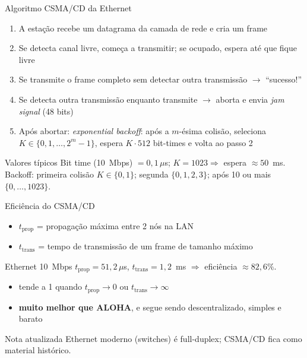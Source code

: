 \documentclass[aspectratio=169,11pt]{beamer}
\begin{document}
\begin{frame}{Algoritmo CSMA/CD da Ethernet}
  \begin{enumerate}
    \item A estação recebe um datagrama da camada de rede e cria um frame
    \item Se detecta canal livre, começa a transmitir; se ocupado, espera até que fique livre
    \item Se transmite o frame completo sem detectar outra transmissão $\rightarrow$ ``sucesso!''
    \item Se detecta outra transmissão enquanto transmite $\rightarrow$ aborta e envia \emph{jam signal} (48 bits)
    \item Após abortar: \emph{exponential backoff}: após a $m$-ésima colisão, seleciona $K\in\{0,1,\ldots,2^m-1\}$, espera $K\cdot 512$ bit-times e volta ao passo 2
  \end{enumerate}
  \begin{exampleblock}{Valores típicos}
    Bit time (10~Mbps) $= 0{,}1\,\mu$s; $K=1023 \Rightarrow$ espera $\approx 50$~ms.
    Backoff: primeira colisão $K\in\{0,1\}$; segunda $\{0,1,2,3\}$; após 10 ou mais $\{0,\ldots,1023\}$.
  \end{exampleblock}
\end{frame}

\begin{frame}{Eficiência do CSMA/CD}
  \begin{itemize}
    \item $t_{\text{prop}}$ = propagação máxima entre 2 nós na LAN
    \item $t_{\text{trans}}$ = tempo de transmissão de um frame de tamanho máximo
  \end{itemize}
  \begin{block}{Ethernet 10~Mbps}
    $t_{\text{prop}} = 51{,}2\,\mu$s, $t_{\text{trans}} = 1{,}2$~ms $\Rightarrow$ eficiência $\approx 82{,}6\%$.
  \end{block}
  \begin{itemize}
    \item tende a 1 quando $t_{\text{prop}}\to 0$ ou $t_{\text{trans}}\to\infty$
    \item \textbf{muito melhor que ALOHA}, e segue sendo descentralizado, simples e barato
  \end{itemize}
  \begin{alertblock}{Nota atualizada}
    Ethernet moderno (switches) é full-duplex; CSMA/CD fica como material histórico.
  \end{alertblock}
\end{frame}
\end{document}
